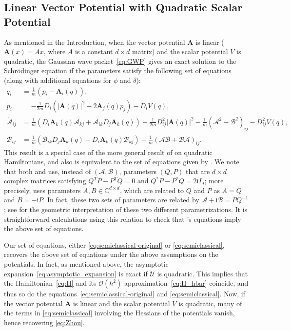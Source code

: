\documentclass[10pt]{article}
\newcommand{\vect}[1]{\boldsymbol{#1}}
\begin{document}
\subsection{Linear Vector Potential with Quadratic Scalar Potential} 
As mentioned in the Introduction, when the vector potential $\vect{A}$ is linear ($\vect{A}(x) = Ax$, where $A$ is a constant $d\times d$ matrix) and the scalar potential $V$ is quadratic, the Gaussian wave packet~\eqref{eq:GWP} gives an exact solution to the Schr\"odinger equation if the parameters satisfy the following set of equations (along with additional equations for $\phi$ and $\delta$):
\begin{equation}
  \label{eq:Zhou}
  \begin{split}
    \dot{q}_i &= \frac{1}{m} (p_{i} - \vect{A}_i(q)),\\
    \dot{p}_i &= -\frac{1}{2m} D_i\left( | \vect{A}(q) |^2 - 2 \vect{A}_j(q) p_j \right) - D_i V(q), \\
    \dot{\mathcal{A}}_{ij} &= \frac{1}{m} ( D_{i} \vect{A}_k(q) \mathcal{A}_{kj}  + \mathcal{A}_{ik} D_j \vect{A}_k(q)) - \frac{1}{2m} D_{ij}^2|\vect{A}(q)|^2 - \frac{1}{m}( \mathcal{A}^2 - \mathcal{B}^2)_{ij} - D_{ij}^2V(q),\\
    \dot{\mathcal{B}}_{ij} &= \frac{1}{ m} ( \mathcal{B}_{ik} D_j \vect{A}_k(q) + D_i \vect{A}_k(q) \mathcal{B}_{kj} ) - \frac{1}{m} (\mathcal{A}\mathcal{B} + \mathcal{B} \mathcal{A})_{ij}.
  \end{split}
\end{equation}
This result is a special case of the more general result of \citet{Ha1998} on quadratic Hamiltonians, and also is equivalent to the set of equations given by \citet{Zh2014}.
We note that both \citeauthor{Ha1998} and \citeauthor{Zh2014} use, instead of $(\mathcal{A},\mathcal{B})$, parameters $(Q,P)$ that are $d\times d$ complex matrices satisfying $Q^{T}P - P^{T}Q = 0$ and $Q^{*}P - P^{*}Q = 2\text{i} I_{d}$; more precisely, \citeauthor{Ha1998} uses parameters $A, B \in \mathbb{C}^{d\times d}$, which are related to $Q$ and $P$ as $A = Q$ and $B = -\text{i} P$.
In fact, these two sets of parameters are related by $\mathcal{A} + \text{i} \mathcal{B} = PQ^{-1}$; see \citet{Oh2015c} for the geometric interpretation of these two different parametrizations.
It is straightforward calculations using this relation to check that \citeauthor{Zh2014}'s equations imply the above set of equations.

Our set of equations, either \eqref{eq:semiclassical-original} or \eqref{eq:semiclassical}, recovers the above set of equations under the above assumptions on the potentials.
In fact, as mentioned above, the asymptotic expansion~\eqref{eq:asymptotic_expansion} is exact if $\mathcal{U}$ is quadratic.
This implies that the Hamiltonian~\eqref{eq:H} and its $\mathcal{O}(\hbar^{2})$ approximation~\eqref{eq:H_hbar} coincide, and thus so do the equations~\eqref{eq:semiclassical-original} and \eqref{eq:semiclassical}.
Now, if the vector potential $\vect{A}$ is linear and the scalar potential $V$ is quadratic, many of the terms in \eqref{eq:semiclassical} involving the Hessians of the potentials vanish, hence recovering \eqref{eq:Zhou}.
\end{document}
